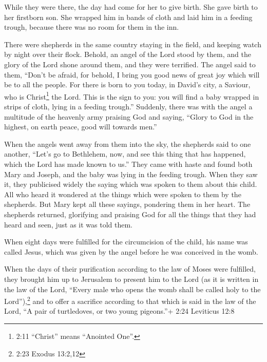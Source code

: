  While they were there, the day had come for her to give
birth.  She gave birth to her firstborn son. She wrapped him
in bands of cloth and laid him in a feeding trough, because there was no
room for them in the inn.

 There were shepherds in the same country staying in the
field, and keeping watch by night over their flock.  Behold,
an angel of the Lord stood by them, and the glory of the Lord shone
around them, and they were terrified.  The angel said to
them, ``Don't be afraid, for behold, I bring you good news of great joy
which will be to all the people.  For there is born to you
today, in David's city, a Saviour, who is Christ\footnote{2:11
  ``Christ'' means ``Anointed One''.} the Lord.  This is
the sign to you: you will find a baby wrapped in strips of cloth, lying
in a feeding trough.''  Suddenly, there was with the angel
a multitude of the heavenly army praising God and saying, 
``Glory to God in the highest, on earth peace, good will towards men.''

 When the angels went away from them into the sky, the
shepherds said to one another, ``Let's go to Bethlehem, now, and see
this thing that has happened, which the Lord has made known to us.''
 They came with haste and found both Mary and Joseph, and
the baby was lying in the feeding trough.  When they saw
it, they publicised widely the saying which was spoken to them about
this child.  All who heard it wondered at the things which
were spoken to them by the shepherds.  But Mary kept all
these sayings, pondering them in her heart.  The shepherds
returned, glorifying and praising God for all the things that they had
heard and seen, just as it was told them.

 When eight days were fulfilled for the circumcision of the
child, his name was called Jesus, which was given by the angel before he
was conceived in the womb.

 When the days of their purification according to the law
of Moses were fulfilled, they brought him up to Jerusalem to present him
to the Lord  (as it is written in the law of the Lord,
``Every male who opens the womb shall be called holy to the
Lord''),\footnote{2:23 Exodus 13:2,12}  and to offer a
sacrifice according to that which is said in the law of the Lord, ``A
pair of turtledoves, or two young pigeons.''+ 2:24 Leviticus 12:8

